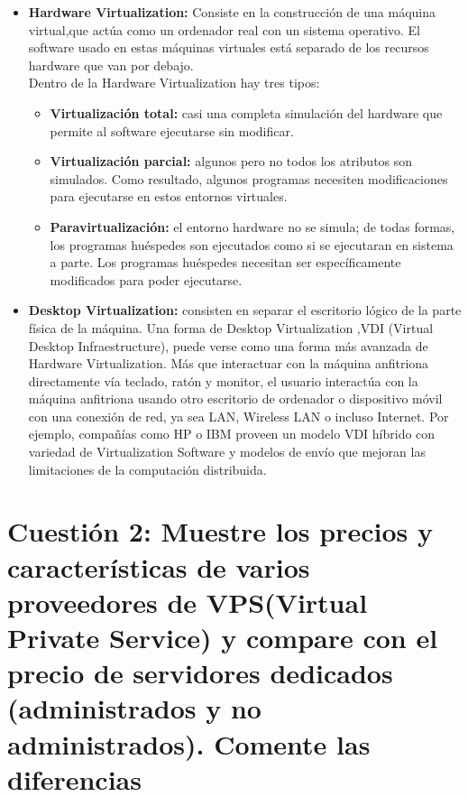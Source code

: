 \begin{itemize}
	\item \textbf{Hardware Virtualization: } Consiste en la construcción de una máquina virtual,que actúa como un ordenador real con un sistema operativo. El software usado en estas máquinas virtuales está separado de los recursos hardware que van por debajo.\\
	Dentro de la Hardware Virtualization hay tres tipos:
	\begin{itemize}
		\item \textbf{Virtualización total: } casi una completa simulación del hardware que permite al software ejecutarse sin modificar.
		\item \textbf{Virtualización parcial: } algunos pero no todos los atributos son simulados. Como resultado, algunos programas necesiten modificaciones para ejecutarse en estos entornos virtuales.
		\item \textbf{Paravirtualización: } el entorno hardware no se simula; de todas formas, los programas huéspedes son ejecutados como si se ejecutaran en sistema a parte. Los programas huéspedes necesitan ser específicamente modificados para poder ejecutarse.
	\end{itemize}
	\item \textbf{Desktop Virtualization: } consisten en separar el escritorio lógico de la parte física de la máquina. Una forma de Desktop Virtualization ,VDI (Virtual Desktop Infraestructure), puede verse como una forma más avanzada de Hardware Virtualization. Más que interactuar con la máquina anfitriona directamente vía teclado, ratón y monitor, el usuario interactúa con la máquina anfitriona usando otro escritorio de ordenador o dispositivo móvil con una conexión de red, ya sea LAN, Wireless LAN o incluso Internet. Por ejemplo, compañías como HP o IBM  proveen un modelo VDI híbrido con variedad de Virtualization Software y modelos de envío que mejoran las limitaciones de la computación distribuida.
\end{itemize}



\section{Cuestión 2: Muestre los precios y características de varios proveedores de VPS(Virtual Private Service) y compare con el precio  de servidores dedicados (administrados y no administrados). Comente las diferencias}

